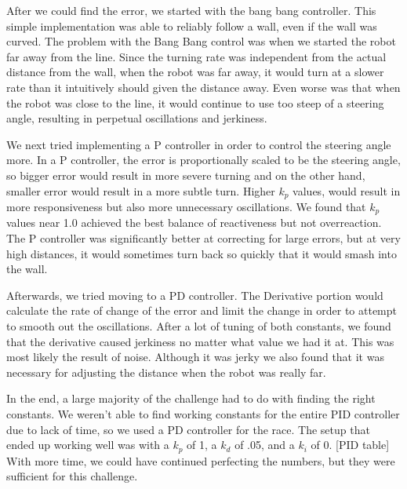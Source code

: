 \documentclass[journal, a4paper]{IEEEtran}
\begin{document}
\par After we could find the error, we started with the bang bang controller. This simple implementation was able to reliably follow a wall, even if the wall was curved. The problem with the Bang Bang control was when we started the robot far away from the line. Since the turning rate was independent from the actual distance from the wall, when the robot was far away, it would turn at a slower rate than it intuitively should given the distance away. Even worse was that when the robot was close to the line, it would continue to use too steep of a steering angle, resulting in perpetual oscillations and jerkiness. 
\par We next tried implementing a P controller in order to control the steering angle more. In a P controller, the error is proportionally scaled to be the steering angle, so bigger error would result in more severe turning and on the other hand, smaller error would result in a more subtle turn. Higher $k_p$ values, would result in more responsiveness but also more unnecessary oscillations. We found that $k_p$ values near 1.0 achieved the best balance of reactiveness but not overreaction. The P controller was significantly better at correcting for large errors, but at very high distances, it would sometimes turn back so quickly that it would smash into the wall. 
\par Afterwards, we tried moving to a PD controller. The Derivative portion would calculate the rate of change of the error and limit the change in order to attempt to smooth out the oscillations. After a lot of tuning of both  constants, we found that the derivative caused jerkiness no matter what value we had it at. This was most likely the result of noise. Although it was jerky we also found that it was  necessary for adjusting the distance when the robot was really far. 
\par In the end, a large majority of the challenge had to do with finding the right constants. We weren't able to find working constants for the entire PID controller due to lack of time, so we used a PD controller for the race. The setup that ended up working well was with a $k_p$ of 1, a $k_d$ of .05, and a $k_i$ of 0. [PID table]
With more time, we could have continued perfecting the numbers, but they were sufficient for this challenge. 
\end{document}
